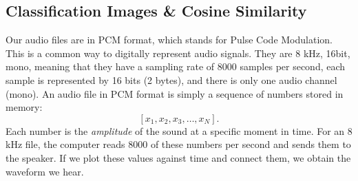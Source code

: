 \documentclass[11pt]{article}
\begin{document}
\begin{center}
\end{center}

\subsection{Classification Images & Cosine Similarity}
Our audio files are in PCM format, which stands for Pulse Code Modulation. This is a common way to digitally represent audio signals.
They are 8 kHz, 16bit, mono, meaning that they have a sampling rate of 8000 samples per second, each sample is represented by 16 bits (2 bytes), and there is only one audio channel (mono).
An audio file in PCM format is simply a sequence of numbers stored in memory:
\[
[x_1, x_2, x_3, \dots, x_N].
\]
Each number is the \emph{amplitude} of the sound at a specific moment in time. 
For an 8 kHz file, the computer reads 8000 of these numbers per second and sends them to the speaker. 
If we plot these values against time and connect them, we obtain the waveform we hear.
\end{document}
